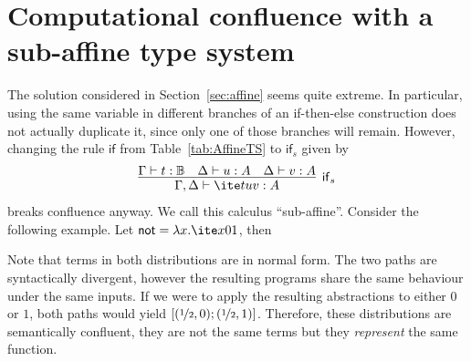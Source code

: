 \section{Computational confluence with a sub-affine type system}\label{sec:subaffine}
The solution considered in Section~\ref{sec:affine} seems quite extreme. In particular, using the same variable in different branches of an if-then-else construction does not actually duplicate it, since only one of those branches will remain. However, changing the rule $\mathsf{if}$ from Table~\ref{tab:AffineTS} to $\mathsf{if}_s$ given by
\[
  \infer[\mathsf{if}_s]{\Gamma,\Delta\vdash\ite t u v:A}{
    \Gamma\vdash t:\mathbb{B}
    & 
    \Delta\vdash u:A 
    &
    \Delta\vdash v:A
  }
\]
breaks confluence anyway. We call this calculus ``sub-affine''.
Consider the following example. Let $\mathsf{not}=\lambda x.\ite x01$, then

\begin{center}
\end{center}

Note that terms in both distributions are in normal form. The two paths are syntactically divergent, however the resulting programs share the same behaviour under the same inputs. If we were to apply the resulting abstractions to either $0$ or $1$, both paths would yield $[(\nicefrac 12, 0); (\nicefrac 12, 1)]$. Therefore, these distributions are semantically confluent, they are not the same terms but they \textit{represent} the same function.

